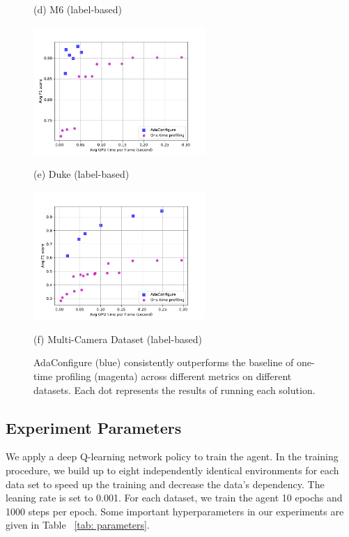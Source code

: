 \begin{figure}[!t]
\begin{minipage}[t]{0.32\linewidth}
		\centerline{(d) M6 (label-based)}
	\end{minipage}
	\hfill
	\begin{minipage}[t]{0.32\linewidth}
		\centerline{\includegraphics[width=6.5cm]{figures/duke_label.pdf}}
		\centerline{(e) Duke (label-based)}
	\end{minipage}
	\hfill
	\begin{minipage}[t]{0.32\linewidth}
		\centerline{\includegraphics[width=6.5cm]{figures/_Westbound_Eastbound_Rear_label.pdf}}
		\centerline{(f) Multi-Camera Dataset (label-based)}
	\end{minipage}		
	\caption{AdaConfigure (blue) consistently outperforms the baseline of one-time profiling (magenta) across different metrics on different datasets. Each dot represents the results of running each solution.}
	\label{fig: results}
\end{figure}


\subsection{Experiment Parameters}
We apply a deep Q-learning network policy to train the agent. In the training procedure, we build up to eight independently identical environments for each data set to speed up the training and decrease the data's dependency. The leaning rate is set to 0.001. For each dataset, we train the agent 10 epochs and 1000 steps per epoch. Some important hyperparameters in our experiments are given in Table ~\ref{tab: parameters}.

